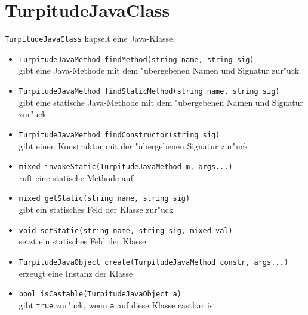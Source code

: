
\section{TurpitudeJavaClass}

\texttt{TurpitudeJavaClass} kapselt eine Java-Klasse.

\begin{itemize}
\item
\texttt{TurpitudeJavaMethod findMethod(string name, string sig)}\\
gibt eine Java-Methode mit dem "ubergebenen Namen und Signatur zur"uck
\item
\texttt{TurpitudeJavaMethod findStaticMethod(string name, string sig)}\\
gibt eine statische Java-Methode mit dem "ubergebenen Namen und Signatur zur"uck
\item
\texttt{TurpitudeJavaMethod findConstructor(string sig)}\\
gibt einen Konstruktor mit der "ubergebenen Signatur zur"uck
\item
\texttt{mixed invokeStatic(TurpitudeJavaMethod m, args...)}\\
ruft eine statische Methode auf
\item
\texttt{mixed getStatic(string name, string sig)}\\
gibt ein statisches Feld der Klasse zur"uck
\item
\texttt{void setStatic(string name, string sig, mixed val)}\\
setzt ein statisches Feld der Klasse
\item
\texttt{TurpitudeJavaObject create(TurpitudeJavaMethod constr, args...)}\\
erzeugt eine Instanz der Klasse
\item
\texttt{bool isCastable(TurpitudeJavaObject a)}\\
gibt \texttt{true} zur"uck, wenn \texttt{a} auf diese Klasse castbar ist.
\end{itemize}
